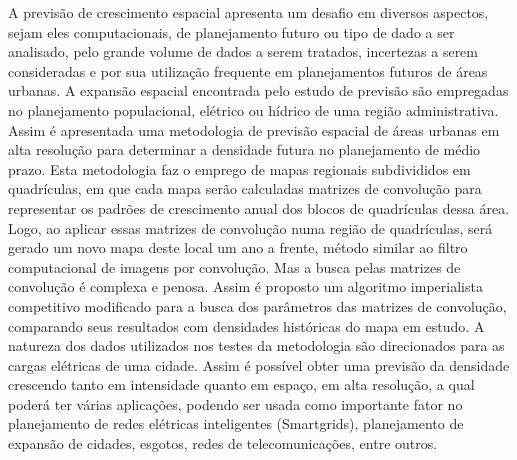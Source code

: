\setlength{\absparsep}{18pt} %
\begin{resumo}

A previsão de crescimento espacial apresenta um desafio em diversos aspectos, sejam eles computacionais, de planejamento futuro ou tipo de dado a ser analisado, pelo grande volume de dados a serem tratados, incertezas a serem consideradas e por sua utilização frequente em planejamentos futuros de áreas urbanas. A expansão espacial encontrada pelo estudo de previsão são empregadas no planejamento populacional, elétrico ou hídrico de uma região administrativa. Assim é apresentada uma metodologia de previsão espacial de áreas urbanas em alta resolução para determinar a densidade futura no planejamento de médio prazo. Esta metodologia faz o emprego de mapas regionais subdivididos em quadrículas, em que cada mapa serão calculadas matrizes de convolução para representar os padrões de crescimento anual dos blocos de quadrículas dessa área. Logo, ao aplicar essas matrizes de convolução numa região de quadrículas, será gerado um novo mapa deste local um ano a frente, método similar ao filtro computacional de imagens por convolução. Mas a busca pelas matrizes de convolução é complexa e penosa. Assim é proposto um algoritmo imperialista competitivo modificado para a busca dos parâmetros das matrizes de convolução, comparando seus resultados com densidades históricas do mapa em estudo. A natureza dos dados utilizados nos testes da metodologia são direcionados para as cargas elétricas de uma cidade. Assim é possível obter uma previsão da densidade crescendo tanto em intensidade quanto em espaço, em alta resolução, a qual poderá ter várias aplicações, podendo ser usada como importante fator no planejamento de redes elétricas inteligentes (Smartgrids), planejamento de expansão de cidades, esgotos, redes de telecomunicações, entre outros. 

\end{resumo}

